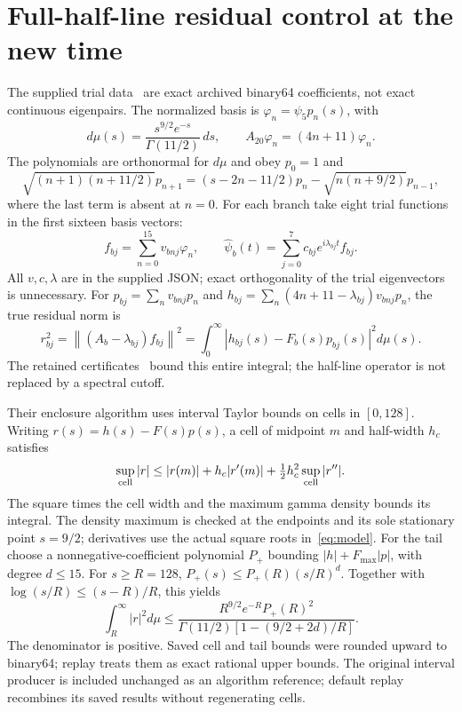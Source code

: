 \documentclass[11pt]{article}
\newcommand{\norm}[1]{\left\lVert#1\right\rVert}
\begin{document}
\section{Full-half-line residual control at the new time}
The supplied trial data~\cite{trialdata} are exact archived binary64 coefficients, not exact continuous eigenpairs.
The normalized basis is $\varphi_n=\psi_5p_n(s)$, with
\begin{equation}
 d\mu(s)=\frac{s^{9/2}e^{-s}}{\Gamma(11/2)}\,ds,\qquad
 A_{20}\varphi_n=(4n+11)\varphi_n.
\end{equation}
The polynomials are orthonormal for $d\mu$ and obey $p_0=1$ and
\begin{equation}
 \sqrt{(n+1)(n+11/2)}p_{n+1}
 =(s-2n-11/2)p_n-\sqrt{n(n+9/2)}p_{n-1},\label{eq:recurrence}
\end{equation}
where the last term is absent at $n=0$.
For each branch take eight trial functions in the first sixteen basis vectors:
\begin{equation}
 f_{bj}=\sum_{n=0}^{15}v_{bnj}\varphi_n,\qquad
 \widehat\psi_b(t)=\sum_{j=0}^{7}c_{bj}e^{i\lambda_{bj}t}f_{bj}.\label{eq:trial}
\end{equation}
All $v,c,\lambda$ are in the supplied JSON; exact orthogonality of the trial eigenvectors is unnecessary.
For $p_{bj}=\sum_nv_{bnj}p_n$ and $h_{bj}=\sum_n(4n+11-\lambda_{bj})v_{bnj}p_n$, the true residual norm is
\begin{equation}
 r_{bj}^2=\norm{(A_b-\lambda_{bj})f_{bj}}^2
 =\int_0^\infty|h_{bj}(s)-F_b(s)p_{bj}(s)|^2d\mu(s).\label{eq:residual}
\end{equation}
The retained certificates~\cite{residualdata} bound this entire integral; the half-line operator is not replaced by a spectral cutoff.

Their enclosure algorithm uses interval Taylor bounds on cells in $[0,128]$.
Writing $r(s)=h(s)-F(s)p(s)$, a cell of midpoint $m$ and half-width $h_c$ satisfies
\begin{equation}
 \sup_{\rm cell}|r|\leq |r(m)|+h_c|r'(m)|+
                \tfrac12h_c^2\sup_{\rm cell}|r''|.\label{eq:cell}
\end{equation}
The square times the cell width and the maximum gamma density bounds its integral.
The density maximum is checked at the endpoints and its sole stationary point $s=9/2$; derivatives use the actual square roots in~\eqref{eq:model}.
For the tail choose a nonnegative-coefficient polynomial $P_+$ bounding $|h|+F_{\max}|p|$, with degree $d\leq15$.
For $s\geq R=128$, $P_+(s)\leq P_+(R)(s/R)^d$.
Together with $\log(s/R)\leq(s-R)/R$, this yields
\begin{equation}
 \int_R^\infty |r|^2d\mu
 \leq\frac{R^{9/2}e^{-R}P_+(R)^2}
 {\Gamma(11/2)[1-(9/2+2d)/R]}.\label{eq:tail}
\end{equation}
The denominator is positive.
Saved cell and tail bounds were rounded upward to binary64; replay treats them as exact rational upper bounds.
The original interval producer is included unchanged as an algorithm reference; default replay recombines its saved results without regenerating cells.
\end{document}

